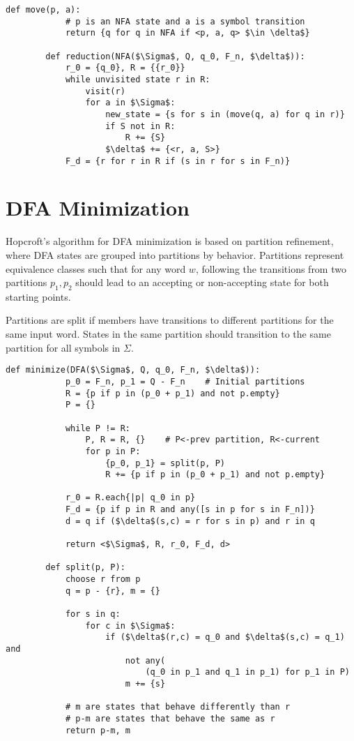 \documentclass[11pt]{article}
\begin{document}
	\begin{lstlisting}[autogobble=true,mathescape]
		def move(p, a):
			# p is an NFA state and a is a symbol transition
			return {q for q in NFA if <p, a, q> $\in \delta$}
			
		def reduction(NFA($\Sigma$, Q, q_0, F_n, $\delta$)):
			r_0 = {q_0}, R = {{r_0}}
			while unvisited state r in R:
				visit(r)
				for a in $\Sigma$:
					new_state = {s for s in (move(q, a) for q in r)}
					if S not in R:
						R += {S}
					$\delta$ += {<r, a, S>}
			F_d = {r for r in R if (s in r for s in F_n)}
	\end{lstlisting}
	
\section{DFA Minimization}
	Hopcroft's algorithm for DFA minimization is based on partition refinement, where DFA states are grouped into partitions by behavior. Partitions represent equivalence classes such that for any word $w$, following the transitions from two partitions $p_1, p_2$ should lead to an accepting or non-accepting state for both starting points.
	
	Partitions are split if members have transitions to different partitions for the same input word. States in the same partition should transition to the same partition for all symbols in $\Sigma$.
	
	\begin{lstlisting}[autogobble=true,mathescape]
		def minimize(DFA($\Sigma$, Q, q_0, F_n, $\delta$)):
			p_0 = F_n, p_1 = Q - F_n	# Initial partitions
			R = {p if p in (p_0 + p_1) and not p.empty}
			P = {}
			
			while P != R:
				P, R = R, {}	# P<-prev partition, R<-current
				for p in P:
					{p_0, p_1} = split(p, P)
					R += {p if p in (p_0 + p_1) and not p.empty}
					
			r_0 = R.each{|p| q_0 in p}
			F_d = {p if p in R and any([s in p for s in F_n])}
			d = q if ($\delta$(s,c) = r for s in p) and r in q
			
			return <$\Sigma$, R, r_0, F_d, d>
			
		def split(p, P):
			choose r from p
			q = p - {r}, m = {}
			
			for s in q:
				for c in $\Sigma$:
					if ($\delta$(r,c) = q_0 and $\delta$(s,c) = q_1) and 
						not any(
							(q_0 in p_1 and q_1 in p_1) for p_1 in P)
						m += {s}
			
			# m are states that behave differently than r
			# p-m are states that behave the same as r
			return p-m, m 
	\end{lstlisting}
	
\end{document}
